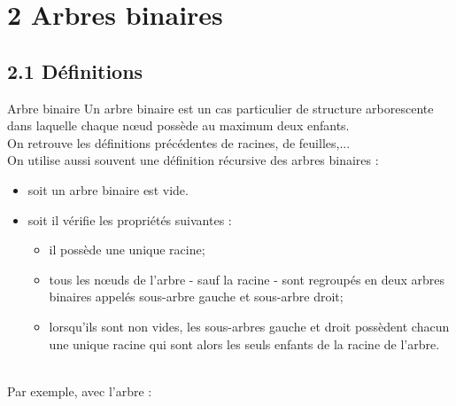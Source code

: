\documentclass[11pt,a4paper,french,twoside]{PMCours}
\begin{document}
\section*{2 Arbres binaires}
\subsection*{2.1 Définitions}
\begin{Definition}{Arbre binaire}
Un {\color{red} arbre binaire} est un cas particulier de structure arborescente dans laquelle chaque nœud possède au maximum deux enfants. \\
On retrouve les définitions précédentes de racines, de feuilles,...\\
On utilise aussi souvent une définition récursive des arbres binaires : 
\begin{itemize}
\item soit un arbre binaire est vide.
\item soit il vérifie les propriétés suivantes :
\begin{itemize}
\item il possède une unique racine;
\item tous les nœuds de l'arbre - sauf la racine - sont regroupés en deux arbres binaires appelés {\color{red} sous-arbre gauche} et {\color{red} sous-arbre droit};
\item lorsqu'ils sont non vides, les sous-arbres gauche et droit possèdent chacun une unique racine qui sont alors les seuls enfants de la racine de l'arbre. 
\end{itemize}
\end{itemize}
\end{Definition}\ \medskip\\
Par exemple, avec l'arbre : 
\end{document}
